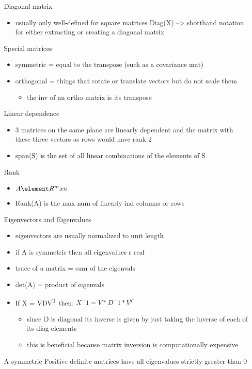 \documentclass[a4paper]{article}
\begin{document}
Diagonal matrix
\begin{itemize}
\item usually only well-defined for square matrices
Diag(X) --> shorthand notation for either extracting or creating a diagonal matrix
\end{itemize}
Special matrices
\begin{itemize}
\item symmetric = equal to the transpose (such as a covariance mat)
\item orthogonal = things that rotate or translate vectors but do not scale them
\begin{itemize}
\item the inv of an ortho matrix is its transpose
\end{itemize}
\end{itemize}
Linear dependence
\begin{itemize}
\item 3 matrices on the same plane are linearly dependent and the matrix with these three vectors as rows would have rank 2
\item span(S) is the set of all linear combinations of the elements of S
\end{itemize}
Rank
\begin{itemize}
\item \(A \element R^mxn\)
\item Rank(A) is the max num of linearly ind columns or rows
\end{itemize}
Eigenvectors and Eigenvalues
\begin{itemize}
\item eigenvectors are usually normalized to unit length
\item if A is symmetric then all eigenvalues r real
\item trace of a matrix = sum of the eigenvals
\item det(A) = product of eigenvals
\item If X = VDV\textsuperscript{T} then:
\(X^-1 = V * D^-1 * V^T\)
\begin{itemize}
\item since D is diagonal its inverse is given by just taking the inverse of each of its diag elements
\item this is beneficial because matrix inversion is computationally expensive
\end{itemize}
\end{itemize}
A symmetric Positive definite matrices have all eigenvalues strictly greater than 0
\end{document}
